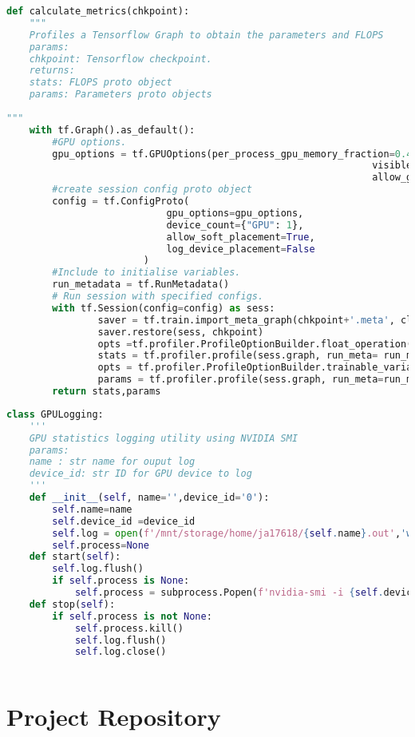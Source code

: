 \begin{lstlisting}[language=Python, caption=Calculating FLOPS and Parameters,label={lst:profiler}]
def calculate_metrics(chkpoint):
	"""
	Profiles a Tensorflow Graph to obtain the parameters and FLOPS
	params:
	chkpoint: Tensorflow checkpoint. 
	returns: 
	stats: FLOPS proto object 
	params: Parameters proto objects
	
"""
	with tf.Graph().as_default():
		#GPU options. 
		gpu_options = tf.GPUOptions(per_process_gpu_memory_fraction=0.4,
																visible_device_list='0',
																allow_growth=True)
		#create session config proto object
		config = tf.ConfigProto(
							gpu_options=gpu_options,
							device_count={"GPU": 1},
							allow_soft_placement=True,
							log_device_placement=False
						)
		#Include to initialise variables. 
		run_metadata = tf.RunMetadata()
		# Run session with specified configs.
		with tf.Session(config=config) as sess:
				saver = tf.train.import_meta_graph(chkpoint+'.meta', clear_devices=True)
				saver.restore(sess, chkpoint)
				opts =tf.profiler.ProfileOptionBuilder.float_operation()
				stats = tf.profiler.profile(sess.graph, run_meta= run_metadata, cmd='op', options=opts)
				opts = tf.profiler.ProfileOptionBuilder.trainable_variables_parameter()    
				params = tf.profiler.profile(sess.graph, run_meta=run_metadata, cmd='op', options=opts)
		return stats,params

\end{lstlisting}



\begin{lstlisting}[language=Python, caption=NVIDIA SMI Logging Tool ,label={lst:logger}]
class GPULogging:
	'''
	GPU statistics logging utility using NVIDIA SMI 
	params: 
	name : str name for ouput log 
	device_id: str ID for GPU device to log
	'''
	def __init__(self, name='',device_id='0'):
		self.name=name
		self.device_id =device_id
		self.log = open(f'/mnt/storage/home/ja17618/{self.name}.out','w+')
		self.process=None
	def start(self):
		self.log.flush()
		if self.process is None:
			self.process = subprocess.Popen(f'nvidia-smi -i {self.device_id} --format=csv -l 1 --query-gpu=index,timestamp,power.draw,utilization.gpu,clocks.current.sm,temperature.gpu,memory.used',stdout = self.log, shell=True)
	def stop(self):
		if self.process is not None:
			self.process.kill()
			self.log.flush()
			self.log.close()
			
\end{lstlisting}
\section{Project Repository}

